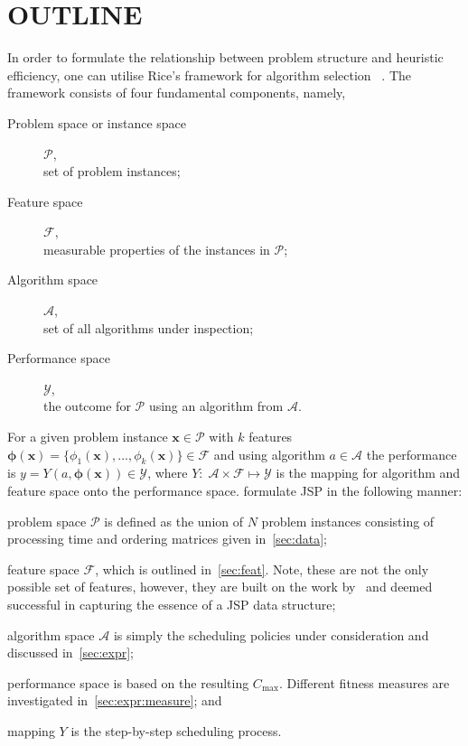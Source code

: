 \documentclass[a4paper,twoside]{article}
\renewcommand{\vec}[1]{\mathbf{#1}}
\newcommand{\vphi}{{\boldsymbol{\phi}}}
\begin{document}
\section{\uppercase{Outline}}
In order to formulate the relationship between problem structure and heuristic efficiency, one can utilise Rice's framework for algorithm selection ~\cite{Rice76}. The framework consists of four fundamental components, namely,
\vfill
\begin{description}
  \item[Problem space or instance space] $\mathcal{P}$, \hfill\\
  set of problem instances; 
  \item[Feature space] $\mathcal{F}$, \hfill\\
  measurable properties of the instances in $\mathcal{P}$;
  \item[Algorithm space] $\mathcal{A}$, \hfill\\
  set of all algorithms under inspection;
  \item[Performance space] $\mathcal{Y}$, \hfill\\
  the outcome for $\mathcal{P}$ using an algorithm from $\mathcal{A}$.
\end{description}
\vfill
For a given problem instance $\vec{x}\in\mathcal{P}$ with $k$ features $\vphi(\vec{x})=\{\phi_1(\vec{x}),...,\phi_k( \vec{x})\}\in\mathcal{F}$ and using algorithm $a\in\mathcal{A}$ the performance is $y=Y(a,\vphi(\vec{x}))\in\mathcal{Y}$, where $Y:\;\mathcal{A}\times\mathcal{F} \mapsto \mathcal{Y}$ is the mapping for algorithm and feature space onto the performance space. 
\cite{SmithMilesLion3,SmithMilesLion5,InRu12} formulate JSP in the following manner: 
\begin{inparaenum} 
\item problem space $\mathcal{P}$ is defined as the union of $N$ problem instances consisting of processing time and ordering matrices given in~\cref{sec:data}; 
\item feature space $\mathcal{F}$, which is outlined in~\cref{sec:feat}. Note, these are not the only possible set of features, however, they are built on the work by~\cite{InRu11a,SmithMilesLion3} and deemed successful in capturing the essence of a JSP data structure;
\item algorithm space $\mathcal{A}$ is simply the scheduling policies under consideration and discussed in~\cref{sec:expr};
\item performance space is based on the resulting $C_{\max}$. Different fitness measures are investigated in~\cref{sec:expr:measure};
and \item mapping $Y$ is the step-by-step scheduling process. 
\end{inparaenum}
\end{document}

